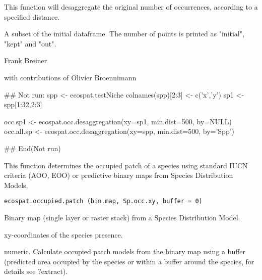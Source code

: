 \documentclass[a4paper]{book}
\begin{document}
%
\begin{Details}\relax
This function will desaggregate the original number of occurrences, according to a specified distance.
\end{Details}
%
\begin{Value}
A subset of the initial dataframe. The number of points is printed as "initial", "kept" and "out".
\end{Value}
%
\begin{Author}\relax
Frank Breiner  

with contributions of Olivier Broennimann 
\end{Author}
%
\begin{Examples}
\begin{ExampleCode}

## Not run: 
spp <- ecospat.testNiche
colnames(spp)[2:3] <- c('x','y')
sp1 <- spp[1:32,2:3]

occ.sp1 <- ecospat.occ.desaggregation(xy=sp1, min.dist=500, by=NULL)
occ.all.sp <- ecospat.occ.desaggregation(xy=spp, min.dist=500, by='Spp')

## End(Not run)
\end{ExampleCode}
\end{Examples}
%
\begin{Description}\relax
This function determines the occupied patch of a species using standard IUCN criteria (AOO, EOO) or predictive binary maps from Species Distribution Models.
\end{Description}
%
\begin{Usage}
\begin{verbatim}
ecospat.occupied.patch (bin.map, Sp.occ.xy, buffer = 0)
\end{verbatim}
\end{Usage}
%
\begin{Arguments}
\begin{ldescription}
 
\item[\code{bin.map}] Binary map (single layer or raster stack) from a Species Distribution Model.
\item[\code{Sp.occ.xy}] xy-coordinates of the species presence.
\item[\code{buffer}] numeric. Calculate occupied patch models from the binary map using a buffer (predicted area occupied by the species or within a buffer around the species, for details see ?extract).
\end{ldescription}
\end{Arguments}
\end{document}
